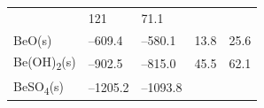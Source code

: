 \documentclass[
  9pt,
]{extbook}
\theoremstyle{definition}
\theoremstyle{definition}
\theoremstyle{definition}
\theoremstyle{remark}
\begin{document}
\begin{longtable}[]{@{}lllll@{}}
\begin{minipage}[t]{0.20\columnwidth}
\strut
\end{minipage} & \begin{minipage}[t]{0.18\columnwidth}\raggedright
121\strut
\end{minipage} & \begin{minipage}[t]{0.18\columnwidth}\raggedright
71.1\strut
\end{minipage}\tabularnewline
\begin{minipage}[t]{0.10\columnwidth}\raggedright
BeO(s)\strut
\end{minipage} & \begin{minipage}[t]{0.19\columnwidth}\raggedright
--609.4\strut
\end{minipage} & \begin{minipage}[t]{0.20\columnwidth}\raggedright
--580.1\strut
\end{minipage} & \begin{minipage}[t]{0.18\columnwidth}\raggedright
13.8\strut
\end{minipage} & \begin{minipage}[t]{0.18\columnwidth}\raggedright
25.6\strut
\end{minipage}\tabularnewline
\begin{minipage}[t]{0.10\columnwidth}\raggedright
Be(OH)\textsubscript{2}(s)\strut
\end{minipage} & \begin{minipage}[t]{0.19\columnwidth}\raggedright
--902.5\strut
\end{minipage} & \begin{minipage}[t]{0.20\columnwidth}\raggedright
--815.0\strut
\end{minipage} & \begin{minipage}[t]{0.18\columnwidth}\raggedright
45.5\strut
\end{minipage} & \begin{minipage}[t]{0.18\columnwidth}\raggedright
62.1\strut
\end{minipage}\tabularnewline
\begin{minipage}[t]{0.10\columnwidth}\raggedright
BeSO\textsubscript{4}(s)\strut
\end{minipage} & \begin{minipage}[t]{0.19\columnwidth}\raggedright
--1205.2\strut
\end{minipage} & \begin{minipage}[t]{0.20\columnwidth}\raggedright
--1093.8\strut
\end{minipage} & \begin{minipage}[t]{0.18\columnwidth}\raggedright

\end{minipage}
\end{longtable}
\end{document}
